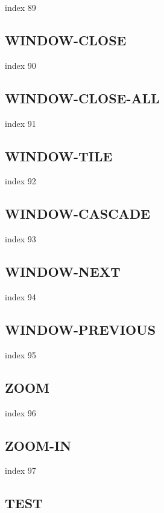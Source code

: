 \documentclass[a4paper]{report}
\begin{document}
{{{{{{{{{{{{{index 89

\subsection{WINDOW-CLOSE}

index 90

\subsection{WINDOW-CLOSE-ALL}

index 91

\subsection{WINDOW-TILE}

index 92

\subsection{WINDOW-CASCADE}

index 93

\subsection{WINDOW-NEXT}

index 94

\subsection{WINDOW-PREVIOUS}

index 95

\subsection{ZOOM}

 index 96

\subsection{ZOOM-IN}

index 97

\subsection{TEST}

}}}}}}}}}}}}}
\end{document}

